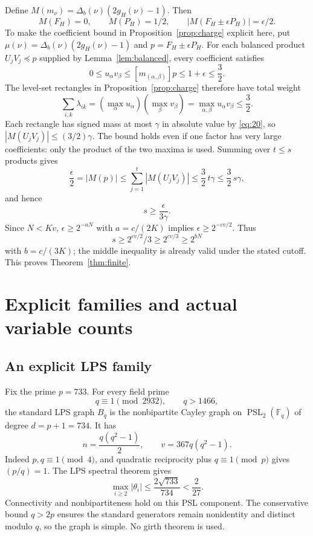 \documentclass[11pt]{article}
\theoremstyle{definition}
\theoremstyle{remark}
\numberwithin{equation}{section}
\begin{document}
Define \(M(m_\nu)=\Delta_b(\nu)(2g_H(\nu)-1)\). Then
\[
             M(F_H)=0,\qquad M(P_H)=1/2,\qquad
             |M(F_H\pm\epsilon P_H)|=\epsilon/2.
\]
To make the coefficient bound in Proposition~\ref{prop:charge}
explicit here, put
\(\mu(\nu)=\Delta_b(\nu)(2g_H(\nu)-1)\) and
\(p=F_H\pm\epsilon P_H\). For each balanced product
\(U_jV_j\preceq p\) supplied by Lemma~\ref{lem:balanced},
every coefficient satisfies
\[
 0\le u_\alpha v_\beta
 \le [m_{(\alpha,\beta)}]p
 \le 1+\epsilon\le\frac32.
\]
The level-set rectangles in Proposition~\ref{prop:charge} therefore
have total weight
\[
 \sum_{i,k}\lambda_{ik}
 =(\max_\alpha u_\alpha)(\max_\beta v_\beta)
 =\max_{\alpha,\beta}u_\alpha v_\beta\le\frac32.
\]
Each rectangle has signed mass at most \(\gamma\) in absolute
value by \eqref{eq:20}, so \(|M(U_jV_j)|\le(3/2)\gamma\).
The bound holds even if one factor has very large coefficients:
only the product of the two maxima is used. Summing over
\(t\le s\) products gives
\[
 \frac{\epsilon}{2}=|M(p)|
 \le\sum_{j=1}^t|M(U_jV_j)|
 \le\frac32\,t\gamma\le\frac32\,s\gamma,
\]
and hence
\begin{equation}\label{eq:21}
s\ge\frac{\epsilon}{3\gamma}.
\end{equation}
Since \(N<Kv\), \(\epsilon\ge2^{-aN}\) with \(a=c/(2K)\)
implies \(\epsilon\ge2^{-cv/2}\). Thus
\[
                  s\ge2^{cv/2}/3\ge2^{cv/3}\ge2^{bN}
\]
with \(b=c/(3K)\); the middle inequality is already valid under
the stated cutoff. This proves Theorem~\ref{thm:finite}.


\section{Explicit families and actual variable counts}\label{sec:explicit}

\subsection{An explicit LPS family}\label{sub:lps}
Fix the prime \(p=733\). For every field prime
\[
                     q\equiv1\pmod{2932},\qquad q>1466,
\]
the standard LPS graph \cite{LPS1988} \(B_q\) is the nonbipartite Cayley graph
on \(\operatorname{PSL}_2(\mathbb F_q)\) of degree \(d=p+1=734\).
It has
\[
 n=\frac{q(q^2-1)}2,\qquad v=367q(q^2-1).
\]
Indeed \(p,q\equiv1\pmod4\), and quadratic reciprocity plus
\(q\equiv1\pmod p\) gives \((p/q)=1\).
The LPS spectral theorem gives
\[
 \max_{i\ge2}|\theta_i|\le\frac{2\sqrt{733}}{734}<\frac2{27}.
\]
Connectivity and nonbipartiteness hold on this PSL component.
The conservative bound \(q>2p\) ensures the standard generators
remain nonidentity and distinct modulo \(q\), so the graph is simple.
No girth theorem is used.
\end{document}
